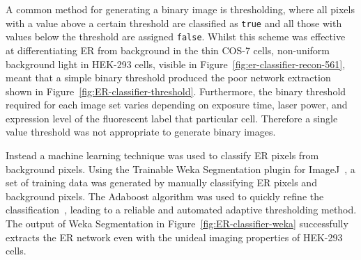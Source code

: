 A common method for generating a binary image is thresholding, where all pixels with a value above a certain threshold are classified as \texttt{true} and all those with values below the threshold are assigned \texttt{false}. 
Whilst this scheme was effective at differentiating ER from background in the thin COS-7 cells, non-uniform background light in HEK-293 cells, visible in Figure~\ref{fig:er-classifier-recon-561}, meant that a simple binary threshold produced the poor network extraction shown in Figure~\ref{fig:ER-classifier-threshold}. 
Furthermore, the binary threshold required for each image set varies depending on exposure time, laser power, and expression level of the fluorescent label that particular cell. 
Therefore a single value threshold was not appropriate to generate binary images. 

Instead a machine learning technique was used to classify ER pixels from background pixels. 
Using the Trainable Weka Segmentation plugin for ImageJ~\cite{arganda2017trainable}, a set of training data was generated by manually classifying ER pixels and background pixels. 
The Adaboost algorithm was used to quickly refine the classification~\cite{freund1997decision, schapire1999brief}, leading to a reliable and automated adaptive thresholding method. 
The output of Weka Segmentation in Figure~\ref{fig:ER-classifier-weka} successfully extracts the ER network even with the unideal imaging properties of HEK-293 cells. 

